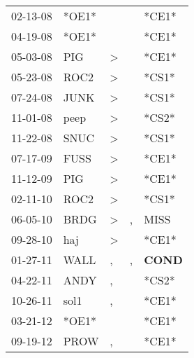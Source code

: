 \begin{supertabular}{p{0.07\textwidth}p{0.06\textwidth}p{0.02\textwidth}p{0.02\textwidth}p{0.06\textwidth}}
 02-13-08\textsuperscript{} &                   *OE1* &               &    &                            *CE1* \\
 04-19-08\textsuperscript{} &                   *OE1* &               &    &                            *CE1* \\
 05-03-08\textsuperscript{} &   PIG\textsuperscript{} &  \textgreater &    &                            *CE1* \\
 05-23-08\textsuperscript{} &  ROC2\textsuperscript{} &  \textgreater &    &                            *CS1* \\
 07-24-08\textsuperscript{} &  JUNK\textsuperscript{} &  \textgreater &    &                            *CS1* \\
 11-01-08\textsuperscript{} &  peep\textsuperscript{} &  \textgreater &    &                            *CS2* \\
 11-22-08\textsuperscript{} &  SNUC\textsuperscript{} &  \textgreater &    &                            *CS1* \\
 07-17-09\textsuperscript{} &  FUSS\textsuperscript{} &  \textgreater &    &                            *CE1* \\
 11-12-09\textsuperscript{} &   PIG\textsuperscript{} &  \textgreater &    &                            *CE1* \\
 02-11-10\textsuperscript{} &  ROC2\textsuperscript{} &  \textgreater &    &                            *CS1* \\
 06-05-10\textsuperscript{} &  BRDG\textsuperscript{} &  \textgreater &  , &           MISS\textsuperscript{} \\
 09-28-10\textsuperscript{} &   haj\textsuperscript{} &  \textgreater &    &                            *CE1* \\
 01-27-11\textsuperscript{} &  WALL\textsuperscript{} &             , &  , &  \textbf{COND\textsuperscript{}} \\
 04-22-11\textsuperscript{} &  ANDY\textsuperscript{} &             , &    &                            *CS2* \\
 10-26-11\textsuperscript{} &  sol1\textsuperscript{} &             , &    &                            *CE1* \\
 03-21-12\textsuperscript{} &                   *OE1* &               &    &                            *CE1* \\
 09-19-12\textsuperscript{} &  PROW\textsuperscript{} &             , &    &                            *CE1* \\

\end{supertabular}
